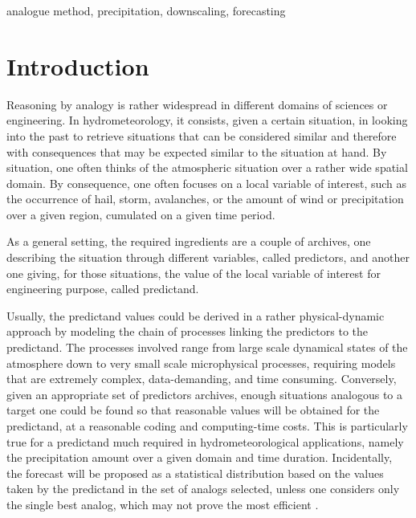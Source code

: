 \documentclass[review]{elsarticle}
\begin{document}
\begin{frontmatter}
\begin{abstract}
The Optimizer integrates the common semi-automatic sequential approach, as well as Monte\textendash Carlo analyses, and a global optimization technique by means of Genetic Algorithms. 

\end{abstract}

\begin{keyword}
analogue method, precipitation, downscaling, forecasting
\end{keyword}

\end{frontmatter}

\linenumbers


\section{Introduction}

Reasoning by analogy is rather widespread in different domains of sciences or engineering. In hydrometeorology, it consists, given a certain situation, in looking into the past to retrieve situations that can be considered similar and therefore with consequences that may be expected similar to the situation at hand. By situation, one often thinks of the atmospheric situation over a rather wide spatial domain. By consequence, one often focuses on a local variable of interest, such as the occurrence of hail, storm, avalanches, or the amount of wind or precipitation over a given region, cumulated on a given time period.

As a general setting, the required ingredients are a couple of archives, one describing the situation through different variables, called predictors, and another one giving, for those situations, the value of the local variable of interest for engineering purpose, called predictand.

Usually, the predictand values could be derived in a rather physical-dynamic approach  by modeling the chain of processes linking the predictors to the predictand. The processes involved range from large scale dynamical states of the atmosphere down to very small scale microphysical processes, requiring models that are extremely complex, data-demanding, and time consuming. Conversely, given an appropriate set of predictors archives, enough situations analogous to a target one could be found so that reasonable values will be obtained for the predictand, at a reasonable coding and computing-time costs. This is particularly true for a predictand much required in hydrometeorological applications, namely the precipitation amount over a given domain and time duration. Incidentally, the forecast will be proposed as a statistical distribution based on the values taken by the predictand in the set of analogs selected, unless one considers only the single best analog, which may not prove the most efficient \citep{Bontron2005}.
\end{document}
